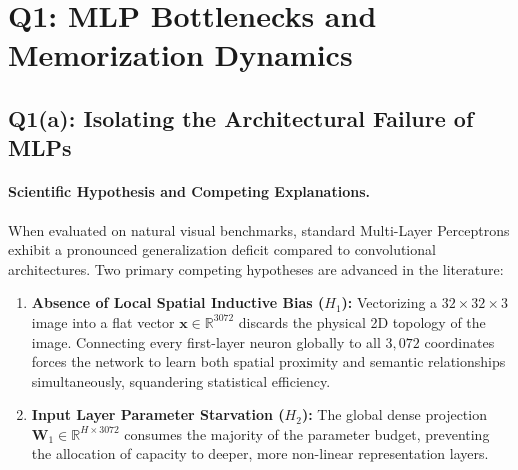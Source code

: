 \section{Q1: MLP Bottlenecks and Memorization Dynamics}
\label{sec:q1}

\subsection{Q1(a): Isolating the Architectural Failure of MLPs}
\paragraph{Scientific Hypothesis and Competing Explanations.}
When evaluated on natural visual benchmarks, standard Multi-Layer Perceptrons exhibit a pronounced generalization deficit compared to convolutional architectures. Two primary competing hypotheses are advanced in the literature:
\begin{enumerate}
    \item \textbf{Absence of Local Spatial Inductive Bias ($H_1$):} Vectorizing a $32 \times 32 \times 3$ image into a flat vector $\mathbf{x} \in \mathbb{R}^{3072}$ discards the physical 2D topology of the image. Connecting every first-layer neuron globally to all $3{,}072$ coordinates forces the network to learn both spatial proximity and semantic relationships simultaneously, squandering statistical efficiency.
    \item \textbf{Input Layer Parameter Starvation ($H_2$):} The global dense projection $\mathbf{W}_1 \in \mathbb{R}^{H \times 3072}$ consumes the majority of the parameter budget, preventing the allocation of capacity to deeper, more non-linear representation layers.
\end{enumerate}

